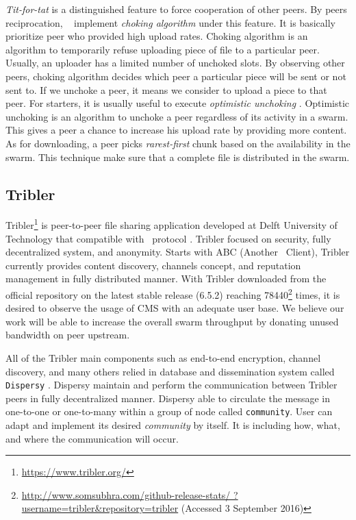 \textit{Tit-for-tat} is a distinguished feature to force cooperation of other peers. By peers reciprocation, \bt~ implement \textit{choking algorithm} under this feature. It is basically prioritize peer who provided high upload rates. Choking algorithm is an algorithm to temporarily refuse uploading piece of file to a particular peer. Usually, an uploader has a limited number of unchoked slots. By observing other peers, choking algorithm decides which peer a particular piece will be sent or not sent to. If we unchoke a peer, it means we consider to upload a piece to that peer. For starters, it is usually useful to execute \textit{optimistic unchoking} \cite{2003:bittorrent:cohen}. Optimistic unchoking is an algorithm to unchoke a peer regardless of its activity in a swarm. This gives a peer a chance to increase his upload rate by providing more content. As for downloading, a peer picks \textit{rarest-first} chunk based on the availability in the swarm. This technique make sure that a complete file is distributed in the swarm.




\subsection{Tribler}
\label{section:tribler}
Tribler\footnote{\url{https://www.tribler.org/}} is peer-to-peer file sharing application developed at Delft University of Technology that compatible with \bt~protocol \cite{2008:tribler:pouwelse}. Tribler focused on security, fully decentralized system, and anonymity. Starts with ABC (Another \bt~Client), Tribler currently provides content discovery, channels concept, and reputation management in fully distributed manner. With Tribler downloaded from the official repository on the latest stable release (6.5.2) reaching  78440\footnote{\url{http://www.somsubhra.com/github-release-stats/ ?username=tribler&repository=tribler} (Accessed 3 September 2016)} times, it is desired to observe the usage of CMS with an adequate user base. We believe our work will be able to increase the overall swarm throughput by donating unused bandwidth on peer upstream.

All of the Tribler main components such as end-to-end encryption, channel discovery, and many others relied in database and dissemination system called \texttt{Dispersy} \cite{2013:dispersy:zeilemaker}. Dispersy maintain and perform the communication between Tribler peers in fully decentralized manner. Dispersy able to circulate the message in one-to-one or one-to-many within a group of node called \texttt{community}. User can adapt and implement its desired \textit{community} by itself. It is including how, what, and where the communication will occur.

